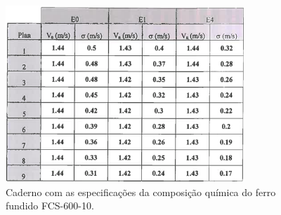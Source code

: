 \newpage
\begin{figure}[htpb]
    \centering
    \includegraphics[width=0.8\textwidth]{Figures/Apendix/Velocidades_tanque.png}
    \caption{Caderno com as especificações da composição química do ferro fundido FCS-600-10.}
    \label{ap:tanque_tempera}
\end{figure}
